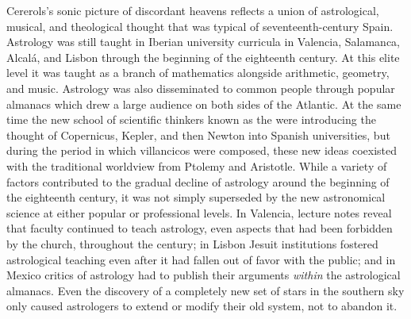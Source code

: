 Cererols's sonic picture of discordant heavens reflects a union of
astrological, musical, and theological thought that was typical of
seventeenth-century Spain.
Astrology was still taught in Iberian university curricula in Valencia,
Salamanca, Alcalá, and Lisbon through the beginning of the eighteenth
century.%
    \Autocites
    {Lanuza:Astrology-Valencia}
    {Nieto-Galan:History-Science-Spain}
At this elite level it was taught as a branch of mathematics alongside
arithmetic, geometry, and music.
Astrology was also disseminated to common people through popular almanacs
which drew a large audience on both sides of the Atlantic.%
    \Autocite
    {Kassell:History-Astrology}
At the same time the new school of scientific thinkers known as the
 were introducing the thought of Copernicus, Kepler, and then
Newton into Spanish universities, but during the period in which
 villancicos were composed, these new ideas coexisted
with the traditional worldview from Ptolemy and Aristotle.
While a variety of factors contributed to the gradual decline of astrology
around the beginning of the eighteenth century, it was not simply superseded by
the new astronomical science at either popular or professional levels.
In Valencia, lecture notes reveal that faculty continued to teach astrology,
even aspects that had been forbidden by the church, throughout the century; in
Lisbon Jesuit institutions fostered astrological teaching even after it had
fallen out of favor with the public; and in Mexico critics of astrology had to
publish their arguments \emph{within} the astrological almanacs.%
    \Autocites
    {Lanuza:Astrology-Valencia}
    {Carolino:Jesuit-Astronomy-Portugal}
    {More:Heretical-Science-Mexico}
Even the discovery of a completely new set of stars in the southern sky only
caused astrologers to extend or modify their old system, not to abandon
it.%
    \Autocites
    {Brosseder:Astrology-Peru-17C}
    {Lanuza:Updating-Astrology}


